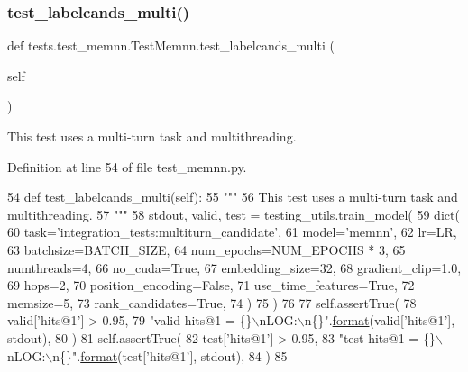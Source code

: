 \subsubsection{\texorpdfstring{test\+\_\+labelcands\+\_\+multi()}{test\_labelcands\_multi()}}
{\footnotesize\ttfamily def tests.\+test\+\_\+memnn.\+Test\+Memnn.\+test\+\_\+labelcands\+\_\+multi (\begin{DoxyParamCaption}\item[{}]{self }\end{DoxyParamCaption})}

\begin{DoxyVerb}This test uses a multi-turn task and multithreading.
\end{DoxyVerb}
 

Definition at line 54 of file test\+\_\+memnn.\+py.


\begin{DoxyCode}
54     \textcolor{keyword}{def }test\_labelcands\_multi(self):
55         \textcolor{stringliteral}{"""}
56 \textcolor{stringliteral}{        This test uses a multi-turn task and multithreading.}
57 \textcolor{stringliteral}{        """}
58         stdout, valid, test = testing\_utils.train\_model(
59             dict(
60                 task=\textcolor{stringliteral}{'integration\_tests:multiturn\_candidate'},
61                 model=\textcolor{stringliteral}{'memnn'},
62                 lr=LR,
63                 batchsize=BATCH\_SIZE,
64                 num\_epochs=NUM\_EPOCHS * 3,
65                 numthreads=4,
66                 no\_cuda=\textcolor{keyword}{True},
67                 embedding\_size=32,
68                 gradient\_clip=1.0,
69                 hops=2,
70                 position\_encoding=\textcolor{keyword}{False},
71                 use\_time\_features=\textcolor{keyword}{True},
72                 memsize=5,
73                 rank\_candidates=\textcolor{keyword}{True},
74             )
75         )
76 
77         self.assertTrue(
78             valid[\textcolor{stringliteral}{'hits@1'}] > 0.95,
79             \textcolor{stringliteral}{"valid hits@1 = \{\}\(\backslash\)nLOG:\(\backslash\)n\{\}"}.\hyperlink{namespaceparlai_1_1chat__service_1_1services_1_1messenger_1_1shared__utils_a32e2e2022b824fbaf80c747160b52a76}{format}(valid[\textcolor{stringliteral}{'hits@1'}], stdout),
80         )
81         self.assertTrue(
82             test[\textcolor{stringliteral}{'hits@1'}] > 0.95,
83             \textcolor{stringliteral}{"test hits@1 = \{\}\(\backslash\)nLOG:\(\backslash\)n\{\}"}.\hyperlink{namespaceparlai_1_1chat__service_1_1services_1_1messenger_1_1shared__utils_a32e2e2022b824fbaf80c747160b52a76}{format}(test[\textcolor{stringliteral}{'hits@1'}], stdout),
84         )
85 
\end{DoxyCode}
\mbox{\label{classtests_1_1test__memnn_1_1TestMemnn_a3e3c10325fc7905dc77b8e1b1db4490a}} 
